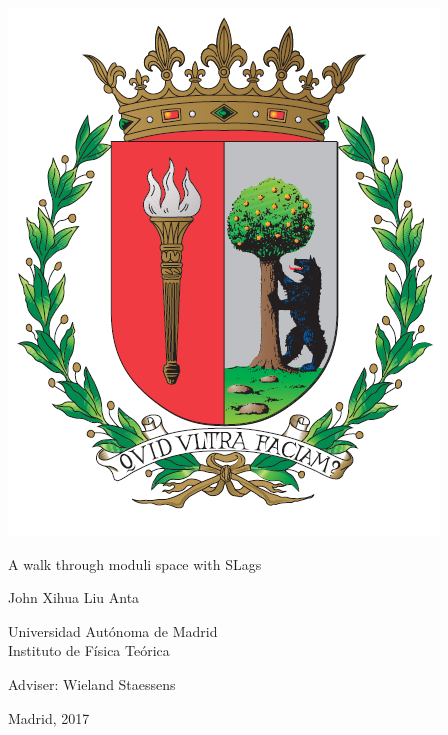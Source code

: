 \thispagestyle{empty}

\begin{center}
\begin{minipage}{1\linewidth}
\centering 
\includegraphics[width=0.3\linewidth]{escudo.PNG}

{\Huge A walk through moduli space with SLags}
\vspace{2cm}

{\LARGE  John Xihua Liu Anta}
\vspace{8cm}

{\Large Universidad Autónoma de Madrid\\
 Instituto de Física Teórica}
\vspace{1cm}

{\Large Adviser: Wieland Staessens}
\vspace{1cm}

{\Large Madrid, 2017}
 
\end{minipage}
\end{center}
\clearpage
